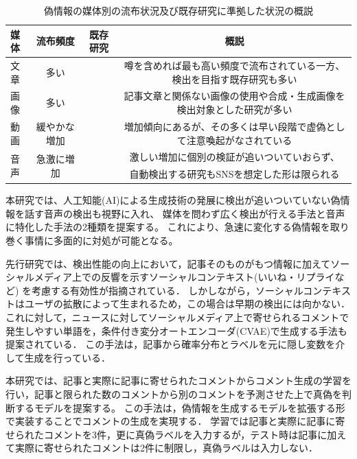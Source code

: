 \begin{landscape}
\begin{table}[p]
    \centering
    \begin{tabular}{l|c|c|c} \hline
       媒体 & 流布頻度 & 既存研究 & 概説\\ \hline\hline
       文章 & 多い & \cite{yanagi2021classifying,10.1145/3292500.3330935} & 噂を含めれば最も高い頻度で流布されている一方、検出を目指す既存研究も多い \\
       画像 & 多い & \cite{Wang:2018:EEA:3219819.3219903,8919302} & 記事文章と関係ない画像の使用や合成・生成画像を検出対象とした研究が多い \\
       動画 & 緩やかな増加 & \cite{8683164,8668407} & 増加傾向にあるが、その多くは早い段階で虚偽として注意喚起がなされている \\
       \multirow{2}{*}{音声} & \multirow{2}{*}{急激に増加\cite{cox_2023}} & \multirow{2}{*}{\cite{yamagishi21_asvspoof}} & %
       激しい増加に個別の検証が追いついていおらず、\\
       & & & 自動検出する研究もSNSを想定した形は限られる \\ \hline
    \end{tabular}
    \caption{偽情報の媒体別の流布状況及び既存研究に準拠した状況の概説}
    \label{tab:modality}
\end{table}
\end{landscape}

本研究では、人工知能(AI)による生成技術の発展に検出が追いついていない偽情報を話す音声の検出も視野に入れ、
媒体を問わず広く検出が行える手法と音声に特化した手法の2種類を提案する。
これにより、急速に変化する偽情報を取り巻く事情に多面的に対処が可能となる。

先行研究では、検出性能の向上において，記事そのものがもつ情報に加えてソーシャルメディア上での反響を示すソーシャルコンテキスト(いいね・リプライなど)
を考慮する有効性が指摘されている\cite{Guo:2018:RDH:3269206.3271709}．
しかしながら，ソーシャルコンテキストはユーザの拡散によって生まれるため，この場合は早期の検出には向かない．
これに対して，ニュースに対してソーシャルメディア上で寄せられるコメントで発生しやすい単語を，条件付き変分オートエンコーダ(CVAE)で生成する手法も提案されている\cite{ijcai2018-533}．
この手法は，記事から確率分布とラベルを元に隠し変数を介して生成を行っている．

本研究では、記事と実際に記事に寄せられたコメントからコメント生成の学習を行い，記事と限られた数のコメントから別のコメントを予測させた上で真偽を判断するモデルを提案する。
この手法は，偽情報を生成するモデル\cite{DBLP:journals/corr/abs-1905-12616}を拡張する形で実装することでコメントの生成を実現する．
学習では記事と実際に記事に寄せられたコメントを3件，更に真偽ラベルを入力するが，テスト時は記事に加えて実際に寄せられたコメントは2件に制限し，真偽ラベルは入力しない．

